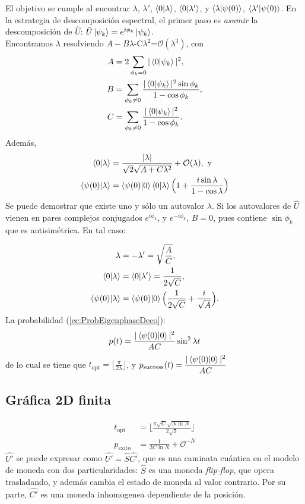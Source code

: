 El objetivo se cumple al encontrar $\lambda$, $\lambda'$, $\braket{0|\lambda}$, $\braket{0|\lambda'}$, y $\braket{\lambda|\psi(0)}$, $\braket{\lambda'|\psi(0)}$. En la estrategia de descomposición espectral, el primer paso es \textit{asumir} la descomposición de $\hat
{U}$: $\hat{U}\ket{\psi_k}=e^{i\phi_k}\ket{\psi_k}$.\\

Encontramos $\lambda$ resolviendo $A-B\lambda$-C$\lambda^2$=$\mathcal{O}(\lambda^3)$, con
\begin{align}
    A&=2\sum_{\phi_k=0}|\braket{0|\psi_k}|^2,\\
    B&=\sum_{\phi_k\neq0}\dfrac{|\braket{0|\psi_k}|^2\sin{\phi_k}}{1-\cos\phi_k},\\
    C&=\sum_{\phi_k\neq0}\dfrac{|\braket{0|\psi_k}|^2}{1-\cos\phi_k}.\\
\end{align}
Además,
\begin{align}
    \braket{0|\lambda}&=\dfrac{|\lambda|}{\sqrt{2}\sqrt{A+C\lambda ^2}}+\mathcal{O}(\lambda),\,\,\text{y}\\
    \braket{\psi(0)|\lambda}&=\braket{\psi(0)|0}\braket{0|\lambda}\Big(1+\frac{i\sin\lambda}{1-\cos\lambda}\Big)
\end{align}
Se puede demostrar que existe uno y sólo un autovalor $\lambda$. Si los autovalores de $\hat{U}$ vienen en pares complejos conjugados $e^{i\phi_k}$, y $e^{-i\phi_k}$, $B=0$, pues contiene $\sin\phi_k$ que es antisimétrica. En tal caso:

\begin{align}
    \lambda&=-\lambda'=\sqrt{\frac{A}{C}},\\
    \braket{0|\lambda}&=\braket{0|\lambda'}=\frac{1}{2\sqrt{C}},\\
    \braket{\psi(0)|\lambda}&=\braket{\psi(0)|0}\Big( \frac{1}{2\sqrt{C}}+\frac{i}{\sqrt{A}}\Big).
\end{align}
La probabilidad (\ref{ec:ProbEigenphaseDeco}):
\begin{equation}
    p(t)=\frac{|\braket{\psi(0)|0}|^2}{AC}\sin^2\lambda t
\end{equation}
de lo cual se tiene que $t_{\text{opt}}=\lfloor\frac{\pi}{2\lambda}\rfloor$, y $p_{\text{success}}(t)=\dfrac{|\braket{\psi(0)|0}|^2}{AC}$

\subsection{Gráfica 2D finita}
\begin{align}
    t_{\text{opt}}&=\lfloor\frac{\pi \sqrt{C}\sqrt{N\ln N}}{2\sqrt{2}}\rfloor\\
    p_{\text{exito}}&=\frac{1}{2C\ln N}+\mathcal{O}^{-N}
\end{align}
$\hat{U'}$ se puede expresar como $\hat{U'}=\hat{S}\hat{C'}$, que es una caminata cuántica en el modelo de moneda con dos particularidades: $\hat{S}$ es una moneda \textit{flip-flop}, que opera trasladando, y además cambia el estado de moneda al valor contrario. Por su parte, $\hat{C'}$ es una moneda inhomogenea dependiente de la posición.
